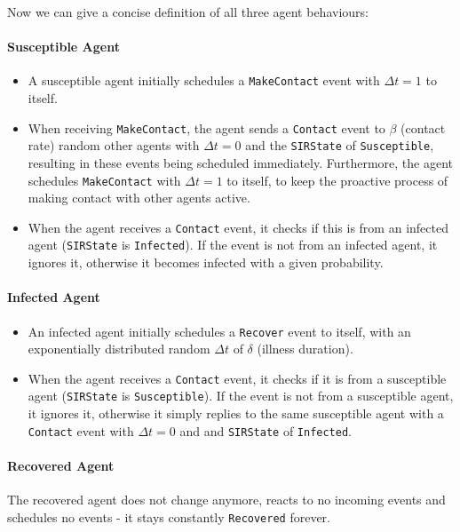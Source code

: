 Now we can give a concise definition of all three agent behaviours:

\paragraph{Susceptible Agent}
\begin{itemize}
	\item A susceptible agent initially schedules a \texttt{MakeContact} event with $\Delta t = 1$ to itself.
	
	\item When receiving \texttt{MakeContact}, the agent sends a \texttt{Contact} event to $\beta$ (contact rate) random other agents with $\Delta t = 0$ and the \texttt{SIRState} of \texttt{Susceptible}, resulting in these events being scheduled immediately. Furthermore, the agent schedules \texttt{MakeContact} with $\Delta t = 1$ to itself, to keep the proactive process of making contact with other agents active.
	
	\item When the agent receives a \texttt{Contact} event, it checks if this is from an infected agent (\texttt{SIRState} is \texttt{Infected}). If the event is not from an infected agent, it ignores it, otherwise it becomes infected with a given probability.
\end{itemize}

\paragraph{Infected Agent}
\begin{itemize}
	\item An infected agent initially schedules a \texttt{Recover} event to itself, with an exponentially distributed random $\Delta t$ of $\delta$ (illness duration).
	
	\item When the agent receives a \texttt{Contact} event, it checks if it is from a susceptible agent (\texttt{SIRState} is \texttt{Susceptible}). If the event is not from a susceptible agent, it ignores it, otherwise it simply replies to the same susceptible agent with a \texttt{Contact} event with $\Delta t = 0$ and and \texttt{SIRState} of \texttt{Infected}.
\end{itemize}

\paragraph{Recovered Agent}
The recovered agent does not change anymore, reacts to no incoming events and schedules no events - it stays constantly \texttt{Recovered} forever.

